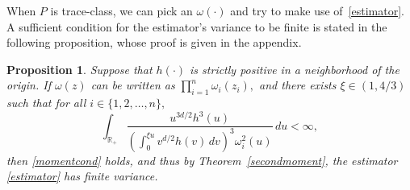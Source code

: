 \documentclass[11pt]{article}
\newtheorem{proposition}{Proposition}
\begin{document}
	When $P$ is trace-class, we can pick an $\omega(\cdot)$ and
        try to make use of~\eqref{estimator}. A sufficient condition
        for the estimator's variance to be finite is stated in the
        following proposition, whose proof is given in the appendix.
	\begin{proposition} \label{nongaussianmoment} Suppose that
          $h(\cdot)$ is strictly positive in a neighborhood of the
          origin.  If $\omega(z)$ can be written as $\prod_{i=1}^{n}
          \omega_i(z_i),$ and there exists $\xi \in (1,4/3)$ such that
          for all $i \in \{1,2,\dots,n\},$
		\begin{equation} \label{nongaussianomega}
		\int_{\mathbb{R}_+} \frac{u^{3d/2}h^3(u)} {(\int_{0}^{\xi u} v^{d/2}h(v) \, dv)^3 \omega_i^2(u) } \, du < \infty,
		\end{equation}
		then \eqref{momentcond} holds, and thus by Theorem~\ref{secondmoment}, the estimator \eqref{estimator} has finite variance.
	\end{proposition}
	
\end{document}
